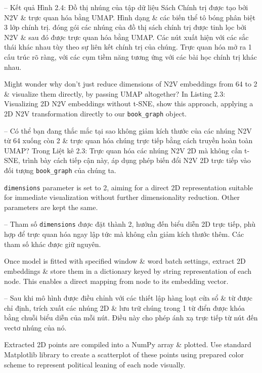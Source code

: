 \documentclass{article}
\begin{document}
\begin{itemize}
\begin{itemize}
\begin{itemize}
           -- Kết quả {\sf Hình 2.4: Đồ thị nhúng của tập dữ liệu Sách Chính trị được tạo bởi N2V \& trực quan hóa bằng UMAP. Hình dạng \& các biến thể tô bóng phân biệt 3 lớp chính trị.} đóng gói các nhúng của đồ thị sách chính trị được tinh lọc bởi N2V \& sau đó được trực quan hóa bằng UMAP. Các nút xuất hiện với các sắc thái khác nhau tùy theo sự liên kết chính trị của chúng. Trực quan hóa mở ra 1 cấu trúc rõ ràng, với các cụm tiềm năng tương ứng với các bài học chính trị khác nhau.

           Might wonder why don't just reduce dimensions of N2V embeddings from 64 to 2 \& visualize them directly, by passing UMAP altogether? In {\sf Listing 2.3: Visualizing 2D N2V embeddings without t-SNE}, show this approach, applying a 2D N2V transformation directly to our \verb|book_graph| object.

           -- Có thể bạn đang thắc mắc tại sao không giảm kích thước của các nhúng N2V từ 64 xuống còn 2 \& trực quan hóa chúng trực tiếp bằng cách truyền hoàn toàn UMAP? Trong {\sf Liệt kê 2.3: Trực quan hóa các nhúng N2V 2D mà không cần t-SNE}, trình bày cách tiếp cận này, áp dụng phép biến đổi N2V 2D trực tiếp vào đối tượng \verb|book_graph| của chúng ta.

           {\tt dimensions} parameter is set to 2, aiming for a direct 2D representation  suitable for immediate visualization without further dimensionality reduction. Other parameters are kept the same.

           -- Tham số {\tt dimensions} được đặt thành 2, hướng đến biểu diễn 2D trực tiếp, phù hợp để trực quan hóa ngay lập tức mà không cần giảm kích thước thêm. Các tham số khác được giữ nguyên.

           Once model is fitted with specified window \& word batch settings, extract 2D embeddings \& store them in a dictionary keyed by string representation of each node. This enables a direct mapping from node to its embedding vector.

           -- Sau khi mô hình được điều chỉnh với các thiết lập hàng loạt cửa sổ \& từ được chỉ định, trích xuất các nhúng 2D \& lưu trữ chúng trong 1 từ điển được khóa bằng chuỗi biểu diễn của mỗi nút. Điều này cho phép ánh xạ trực tiếp từ nút đến vectơ nhúng của nó.

           Extracted 2D points are compiled into a NumPy array \& plotted. Use standard Matplotlib library to create a scatterplot of these points using prepared color scheme to represent political leaning of each node visually.


\end{itemize}
\end{itemize}
\end{itemize}
\end{document}
